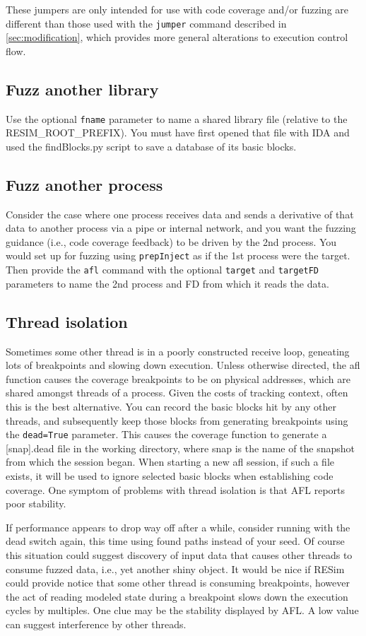 \documentclass[titlepage]{article}
\begin{document}
These jumpers are only intended for use with code coverage and/or fuzzing are different than those used with the {\tt jumper} command described
in \ref{sec:modification},
which provides more general alterations to execution control flow.

\subsection{Fuzz another library}
Use the optional {\tt fname} parameter to name a shared library file (relative to the RESIM\_ROOT\_PREFIX).  You must have first
opened that file with IDA and used the findBlocks.py script to save a database of its basic blocks.

\subsection{Fuzz another process}
Consider the case where one process receives data and sends a derivative of that data to another process via a pipe or internal network,
and you want the fuzzing guidance (i.e., code coverage feedback) to be driven by the 2nd process.  You would set up for fuzzing using
{\tt prepInject} as if the 1st process were the target.  Then provide the {\tt afl} command with the optional {\tt target} and {\tt targetFD}
parameters to name the 2nd process and FD from which it reads the data.

\subsection{Thread isolation}
Sometimes some other thread is in a poorly constructed receive loop, geneating lots of breakpoints and slowing down execution.
Unless otherwise directed, the afl function causes the coverage breakpoints to be on physical addresses, which are shared amongst threads of a process.  Given the costs
of tracking context, often this is the best alternative.  You can record the basic blocks hit by any other threads, and subsequently keep those blocks from generating
breakpoints using the {\tt dead=True} parameter.  This causes the coverage function to generate a [snap].dead file in the working directory, where snap is the
name of the snapshot from which the session began.  When starting a new afl session, if such a file exists, it will be used to ignore selected basic blocks
when establishing code coverage.  One symptom of problems with thread isolation is that AFL reports poor stability.

If performance appears to drop way off after a while, consider running with the dead switch again, this time using found paths instead of your seed.  Of course
this situation could suggest discovery of input data that causes other threads to consume fuzzed data, i.e., yet another shiny object.
It would be nice if RESim could provide notice that some other thread is consuming breakpoints, however the act of reading modeled state during a 
breakpoint slows down the execution cycles by multiples.  One clue may be the stability displayed by AFL.  A low value can suggest interference by other threads.
\end{document}
